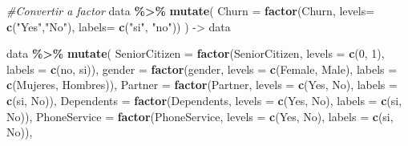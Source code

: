 \documentclass[
]{article}
\newenvironment{Shaded}{\begin{snugshade}}{\end{snugshade}}
\newcommand{\AttributeTok}[1]{\textcolor[rgb]{0.13,0.29,0.53}{#1}}
\newcommand{\CommentTok}[1]{\textcolor[rgb]{0.56,0.35,0.01}{\textit{#1}}}
\newcommand{\DecValTok}[1]{\textcolor[rgb]{0.00,0.00,0.81}{#1}}
\newcommand{\FunctionTok}[1]{\textcolor[rgb]{0.13,0.29,0.53}{\textbf{#1}}}
\newcommand{\NormalTok}[1]{#1}
\newcommand{\OtherTok}[1]{\textcolor[rgb]{0.56,0.35,0.01}{#1}}
\newcommand{\SpecialCharTok}[1]{\textcolor[rgb]{0.81,0.36,0.00}{\textbf{#1}}}
\newcommand{\StringTok}[1]{\textcolor[rgb]{0.31,0.60,0.02}{#1}}
\begin{document}
\begin{Shaded}
\begin{Highlighting}[]
\CommentTok{\#Convertir a factor}
\NormalTok{data }\SpecialCharTok{\%\textgreater{}\%}
  \FunctionTok{mutate}\NormalTok{( }\AttributeTok{Churn =} \FunctionTok{factor}\NormalTok{(Churn,}
  \AttributeTok{levels=} \FunctionTok{c}\NormalTok{(}\StringTok{"Yes"}\NormalTok{,}\StringTok{"No"}\NormalTok{),}
  \AttributeTok{labels=} \FunctionTok{c}\NormalTok{(}\StringTok{"si"}\NormalTok{, }\StringTok{"no"}\NormalTok{))}
\NormalTok{  ) }\OtherTok{{-}\textgreater{}}\NormalTok{ data}



\NormalTok{data }\SpecialCharTok{\%\textgreater{}\%}
  \FunctionTok{mutate}\NormalTok{(}
    \AttributeTok{SeniorCitizen =} \FunctionTok{factor}\NormalTok{(SeniorCitizen, }\AttributeTok{levels =} \FunctionTok{c}\NormalTok{(}\DecValTok{0}\NormalTok{, }\DecValTok{1}\NormalTok{), }\AttributeTok{labels =} \FunctionTok{c}\NormalTok{(}\StringTok{\textquotesingle{}no\textquotesingle{}}\NormalTok{, }\StringTok{\textquotesingle{}si\textquotesingle{}}\NormalTok{)),}
    \AttributeTok{gender =} \FunctionTok{factor}\NormalTok{(gender, }\AttributeTok{levels =} \FunctionTok{c}\NormalTok{(}\StringTok{\textquotesingle{}Female\textquotesingle{}}\NormalTok{, }\StringTok{\textquotesingle{}Male\textquotesingle{}}\NormalTok{), }\AttributeTok{labels =} \FunctionTok{c}\NormalTok{(}\StringTok{\textquotesingle{}Mujeres\textquotesingle{}}\NormalTok{, }\StringTok{\textquotesingle{}Hombres\textquotesingle{}}\NormalTok{)),}
    \AttributeTok{Partner =} \FunctionTok{factor}\NormalTok{(Partner, }\AttributeTok{levels =} \FunctionTok{c}\NormalTok{(}\StringTok{\textquotesingle{}Yes\textquotesingle{}}\NormalTok{, }\StringTok{\textquotesingle{}No\textquotesingle{}}\NormalTok{), }\AttributeTok{labels =} \FunctionTok{c}\NormalTok{(}\StringTok{\textquotesingle{}si\textquotesingle{}}\NormalTok{, }\StringTok{\textquotesingle{}No\textquotesingle{}}\NormalTok{)),}
    \AttributeTok{Dependents =} \FunctionTok{factor}\NormalTok{(Dependents, }\AttributeTok{levels =} \FunctionTok{c}\NormalTok{(}\StringTok{\textquotesingle{}Yes\textquotesingle{}}\NormalTok{, }\StringTok{\textquotesingle{}No\textquotesingle{}}\NormalTok{), }\AttributeTok{labels =} \FunctionTok{c}\NormalTok{(}\StringTok{\textquotesingle{}si\textquotesingle{}}\NormalTok{, }\StringTok{\textquotesingle{}No\textquotesingle{}}\NormalTok{)),}
    \AttributeTok{PhoneService =} \FunctionTok{factor}\NormalTok{(PhoneService, }\AttributeTok{levels =} \FunctionTok{c}\NormalTok{(}\StringTok{\textquotesingle{}Yes\textquotesingle{}}\NormalTok{, }\StringTok{\textquotesingle{}No\textquotesingle{}}\NormalTok{), }\AttributeTok{labels =} \FunctionTok{c}\NormalTok{(}\StringTok{\textquotesingle{}si\textquotesingle{}}\NormalTok{, }\StringTok{\textquotesingle{}No\textquotesingle{}}\NormalTok{)),}

\end{Highlighting}
\end{Shaded}
\end{document}

